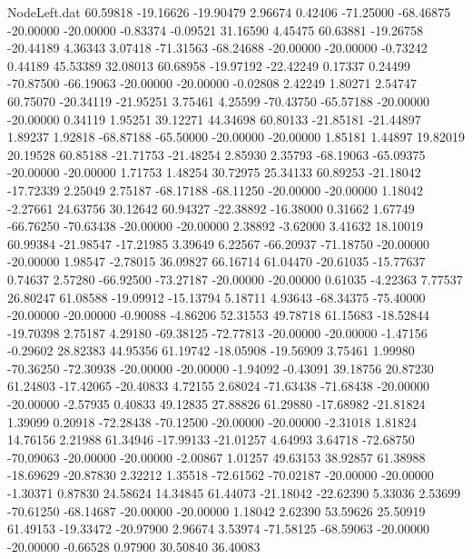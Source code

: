 \begin{filecontents}{NodeLeft.dat}
  60.59818  -19.16626  -19.90479     2.96674    0.42406  -71.25000  -68.46875  -20.00000  -20.00000   -0.83374   -0.09521   31.16590    4.45475
  60.63881  -19.26758  -20.44189     4.36343    3.07418  -71.31563  -68.24688  -20.00000  -20.00000   -0.73242    0.44189   45.53389   32.08013
  60.68958  -19.97192  -22.42249     0.17337    0.24499  -70.87500  -66.19063  -20.00000  -20.00000   -0.02808    2.42249    1.80271    2.54747
  60.75070  -20.34119  -21.95251     3.75461    4.25599  -70.43750  -65.57188  -20.00000  -20.00000    0.34119    1.95251   39.12271   44.34698
  60.80133  -21.85181  -21.44897     1.89237    1.92818  -68.87188  -65.50000  -20.00000  -20.00000    1.85181    1.44897   19.82019   20.19528
  60.85188  -21.71753  -21.48254     2.85930    2.35793  -68.19063  -65.09375  -20.00000  -20.00000    1.71753    1.48254   30.72975   25.34133
  60.89253  -21.18042  -17.72339     2.25049    2.75187  -68.17188  -68.11250  -20.00000  -20.00000    1.18042   -2.27661   24.63756   30.12642
  60.94327  -22.38892  -16.38000     0.31662    1.67749  -66.76250  -70.63438  -20.00000  -20.00000    2.38892   -3.62000    3.41632   18.10019
  60.99384  -21.98547  -17.21985     3.39649    6.22567  -66.20937  -71.18750  -20.00000  -20.00000    1.98547   -2.78015   36.09827   66.16714
  61.04470  -20.61035  -15.77637     0.74637    2.57280  -66.92500  -73.27187  -20.00000  -20.00000    0.61035   -4.22363    7.77537   26.80247
  61.08588  -19.09912  -15.13794     5.18711    4.93643  -68.34375  -75.40000  -20.00000  -20.00000   -0.90088   -4.86206   52.31553   49.78718
  61.15683  -18.52844  -19.70398     2.75187    4.29180  -69.38125  -72.77813  -20.00000  -20.00000   -1.47156   -0.29602   28.82383   44.95356
  61.19742  -18.05908  -19.56909     3.75461    1.99980  -70.36250  -72.30938  -20.00000  -20.00000   -1.94092   -0.43091   39.18756   20.87230
  61.24803  -17.42065  -20.40833     4.72155    2.68024  -71.63438  -71.68438  -20.00000  -20.00000   -2.57935    0.40833   49.12835   27.88826
  61.29880  -17.68982  -21.81824     1.39099    0.20918  -72.28438  -70.12500  -20.00000  -20.00000   -2.31018    1.81824   14.76156    2.21988
  61.34946  -17.99133  -21.01257     4.64993    3.64718  -72.68750  -70.09063  -20.00000  -20.00000   -2.00867    1.01257   49.63153   38.92857
  61.38988  -18.69629  -20.87830     2.32212    1.35518  -72.61562  -70.02187  -20.00000  -20.00000   -1.30371    0.87830   24.58624   14.34845
  61.44073  -21.18042  -22.62390     5.33036    2.53699  -70.61250  -68.14687  -20.00000  -20.00000    1.18042    2.62390   53.59626   25.50919
  61.49153  -19.33472  -20.97900     2.96674    3.53974  -71.58125  -68.59063  -20.00000  -20.00000   -0.66528    0.97900   30.50840   36.40083

\end{filecontents}

